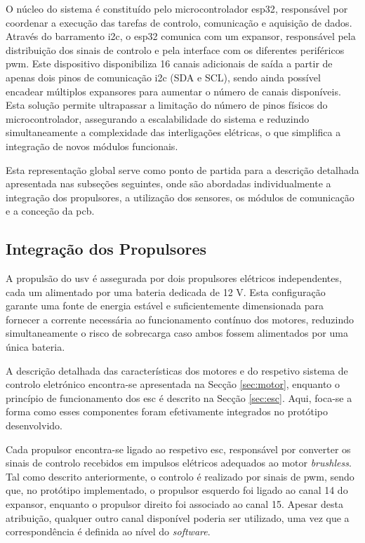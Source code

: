 O núcleo do sistema é constituído pelo microcontrolador \gls{esp32}, responsável por coordenar a execução das tarefas de controlo, comunicação e aquisição de dados. Através do barramento \gls{i2c}, o \gls{esp32} comunica com um expansor, responsável pela distribuição dos sinais de controlo e pela interface com os diferentes periféricos \gls{pwm}. Este dispositivo disponibiliza 16 canais adicionais de saída a partir de apenas dois pinos de comunicação \gls{i2c} (SDA e SCL), sendo ainda possível encadear múltiplos expansores para aumentar o número de canais disponíveis. Esta solução permite ultrapassar a limitação do número de pinos físicos do microcontrolador, assegurando a escalabilidade do sistema e reduzindo simultaneamente a complexidade das interligações elétricas, o que simplifica a integração de novos módulos funcionais.

Esta representação global serve como ponto de partida para a descrição detalhada apresentada nas subseções seguintes, onde são abordadas individualmente a integração dos propulsores, a utilização dos sensores, os módulos de comunicação e a conceção da \gls{pcb}.

\subsection{Integração dos Propulsores}
\label{subsec:integracao-propulsores}

A propulsão do \gls{usv} é assegurada por dois propulsores elétricos independentes, cada um alimentado por uma bateria dedicada de 12 V. Esta configuração garante uma fonte de energia estável e suficientemente dimensionada para fornecer a corrente necessária ao funcionamento contínuo dos motores, reduzindo simultaneamente o risco de sobrecarga caso ambos fossem alimentados por uma única bateria.  

A descrição detalhada das características dos motores e do respetivo sistema de controlo eletrónico encontra-se apresentada na Secção \ref{sec:motor}, enquanto o princípio de funcionamento dos \gls{esc} é descrito na Secção \ref{sec:esc}. Aqui, foca-se a forma como esses componentes foram efetivamente integrados no protótipo desenvolvido.

Cada propulsor encontra-se ligado ao respetivo \gls{esc}, responsável por converter os sinais de controlo recebidos em impulsos elétricos adequados ao motor \emph{brushless}. Tal como descrito anteriormente, o controlo é realizado por sinais de \gls{pwm}, sendo que, no protótipo implementado, o propulsor esquerdo foi ligado ao canal 14 do expansor, enquanto o propulsor direito foi associado ao canal 15. Apesar desta atribuição, qualquer outro canal disponível poderia ser utilizado, uma vez que a correspondência é definida ao nível do \emph{software}.  

